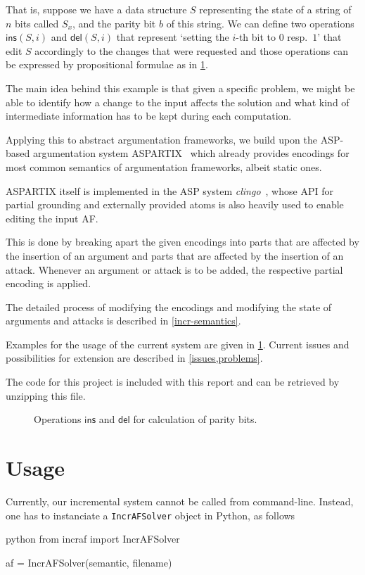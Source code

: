 \documentclass[oneside,12pt]{amsart}
\begin{document}
That is, suppose we have a data structure $S$ representing the state of a
string of $n$ bits called $S_x$, and the parity bit $b$ of this string.
We can define two operations $\mathsf{ins}(S,i)$ and $\mathsf{del}(S,i)$ 
that represent `setting the $i$-th bit to $0$ resp.\ $1$' that edit $S$ 
accordingly to the changes that were requested and those operations 
can be expressed by propositional formulae as in \cref{dynfo-parity}.

The main idea behind this example is that given a specific problem, we 
might be able to identify how a change to the input affects the solution 
and what kind of intermediate information has to be kept during each computation.

Applying this to abstract argumentation frameworks, we build upon the 
ASP-based argumentation system ASPARTIX~\cite{aspartix_website,aspartix} which already 
provides encodings for most common semantics of argumentation frameworks, albeit static ones.

ASPARTIX itself is implemented in the ASP system \emph{clingo}~\cite{clingo,potassco}, whose API 
for partial grounding and externally provided atoms is also heavily used 
to enable editing the input AF.

This is done by breaking apart the given encodings into parts that are affected
by the insertion of an argument and parts that are affected by the 
insertion of an attack. Whenever an argument or attack is to be added,
the respective partial encoding is applied. 

The detailed process of modifying the encodings and modifying 
the state of arguments and attacks is described in \cref{incr-semantics}.

Examples for the usage of the current system are given in \cref{usage}.
Current issues and possibilities for extension are described in \cref{issues,problems}.

The code for this project is included with this report and can be retrieved by
unzipping this file.

\begin{figure}
    
    \caption{Operations $\mathsf{ins}$ and $\mathsf{del}$ for calculation of parity bits.}
    \label{dynfo-parity}
\end{figure}

\section{Usage}\label{usage}
Currently, our incremental system cannot be called from command-line. Instead, one has to 
instanciate a \texttt{IncrAFSolver} object in Python, as follows
\begin{mintedbox}{python}
from incraf import IncrAFSolver

af = IncrAFSolver(semantic, filename)\end{mintedbox}
\end{document}
